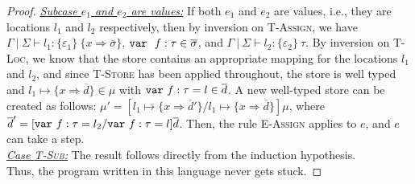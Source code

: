 \begin{proof}
\underline{\textit{Subcase $e_1$ and $e_2$ are values:}} If both $e_1$ and $e_2$ are values, i.e., they are locations $l_1$ and $l_2$ respectively, then by inversion on \textsc{T-Assign}, we have $\Gamma~|~\Sigma \vdash l_1 : \{ \varepsilon_1 \}~\{ x \Rightarrow \overline{\sigma} \}$, $\mathtt{var}~~ f : \tau \in \overline{\sigma}$, and $\Gamma~|~\Sigma \vdash l_2 : \{ \varepsilon_2 \}~\tau$. By inversion on \textsc{T-Loc}, we know that the store contains an appropriate mapping for the locations $l_1$ and $l_2$, and since \textsc{T-Store} has been applied throughout, the store is well typed and $l_1 \mapsto \{ x \Rightarrow \overline{d} \} \in \mu$ with $\mathtt{var}~ f : \tau = l \in \overline{d}$. A new well-typed store can be created as follows: $\mu' = [l_1 \mapsto \{ x \Rightarrow \overline{d}' \}/l_1 \mapsto \{ x \Rightarrow \overline{d} \}]\mu$, where $\overline{d}' = [\mathtt{var}~ f : \tau = l_2/\mathtt{var}~ f : \tau = l]\overline{d}$. Then, the rule \textsc{E-Assign} applies to $e$, and $e$ can take a step.
\\

\noindent\underline{\textit{Case \textsc{T-Sub}:}}
The result follows directly from the induction hypothesis.
\\

\noindent Thus, the program written in this language never gets stuck.
\end{proof}









